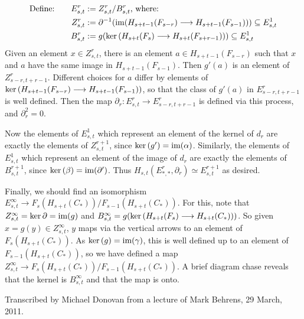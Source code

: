\documentclass[11pt]{article}
\newcommand{\im}{\mbox{im}}
\renewcommand{\ker}{\textup{ker}\,}
\theoremstyle{plain}
\theoremstyle{definition}
\renewcommand{\to}{\longrightarrow}
\begin{document}
\begin{alignat*}{2}
\text{Define:\qquad } E^r_{s,t}&:=Z^r_{s,t}/B^r_{s,t}\text{, where:}\\
Z^r_{s,t}&:=\partial^{-1}(\im(H_{s+t-1}(F_{s-r})\to H_{s+t-1}(F_{s-1})))\subseteq E^1_{s,t}\\
B^r_{s,t}&:=g(\ker(H_{s+t}(F_{s})\to H_{s+t}(F_{s+r-1})))\subseteq E^1_{s,t}
\end{alignat*}
Given an element $x\in Z^r_{s,t}$, there is an element $a\in H_{s+t-1}(F_{s-r})$ such that $x$ and $a$ have the same image in $H_{s+t-1}(F_{s-1})$. Then $g'(a)$ is an element of $Z^r_{s-r,t+r-1}$. Different choices for $a$ differ by elements of $\ker(H_{s+t-1}(F_{s-r})\to H_{s+t-1}(F_{s-1}))$, so that the class of $g'(a)$ in $E^r_{s-r,t+r-1}$ is well defined. Then the map $\partial_r:E^r_{s,t}\to E^r_{s-r,t+r-1}$ is defined via this process, and $\partial_r^2=0$.

Now the elements of $E^1_{s,t}$ which represent an element of the kernel of $d_r$ are exactly the elements of $Z^{r+1}_{s,t}$, since $\ker(g')=\im(\alpha)$. Similarly, the elements of $E^1_{s,t}$ which represent an element of the image of $d_r$ are exactly the elements of $B^{r+1}_{s,t}$, since $\ker(\beta)=\im(\partial')$. Thus $H_{s,t}(E^r_{*,*},\partial_r)\simeq E^{r+1}_{s,t}$ as desired.

Finally, we should find an isomorphism $E^\infty_{s,t}\to F_s(H_{s+t}(C_*))/F_{s-1}(H_{s+t}(C_*))$. For this, note that $Z^\infty_{s,t}=\ker\partial=\im(g)$ and $B^\infty_{s,t}=g(\ker(H_{s+t}(F_s)\to H_{s+t}(C_*)))$. So given $x=g(y)\in Z^\infty_{s,t}$, $y$ maps via the vertical arrows to an element of $F_s(H_{s+t}(C_*))$. As $\ker(g)=\im(\gamma)$, this is well defined up to an element of $F_{s-1}(H_{s+t}(C_*))$, so we have defined a map $Z^\infty_{s,t}\to F_s(H_{s+t}(C_*))/F_{s-1}(H_{s+t}(C_*))$. A brief diagram chase reveals that the kernel is $B^\infty_{s,t}$ and that the map is onto.

\begin{flushright}
 {\small Transcribed  by Michael Donovan from a lecture of Mark Behrens, 29 March, 2011.}
\end{flushright}
\pagebreak

\newcommand{\shrt}[1]{\makebox[0cm]{\ensuremath{#1}}}
\end{document}

